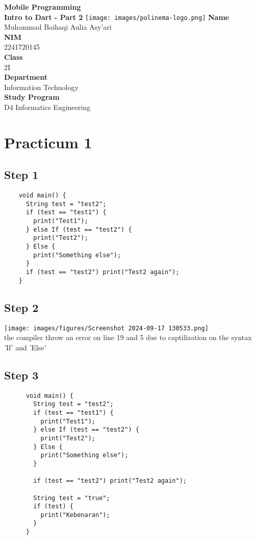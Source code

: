 \documentclass[12pt,titlepage]{article}
\newcommand{\vSubject}{Mobile Programming}
\newcommand{\vSubtitle}{Intro to Dart - Part 2}
\newcommand{\vName}{Muhammad Baihaqi Aulia Asy'ari}
\newcommand{\vNIM}{2241720145}
\newcommand{\vClass}{2I}
\newcommand{\vDepartment}{Information Technology}
\newcommand{\vStudyProgram}{D4 Informatics Engineering}
\begin{document}
\begin{titlepage}
    \centering
    \vfill
    {\bfseries\LARGE
        \vSubject\\
        \vskip0.25cm
        \vSubtitle
    }
    \vfill
    \texttt{[image: images/polinema-logo.png]}
    \vfill
    {
        \textbf{Name}\\
        \vName\\
        \vskip0.5cm
        \textbf{NIM}\\
        \vNIM\\
        \vskip0.5cm
        \textbf{Class}\\
        \vClass\\
        \vskip0.5cm
        \textbf{Department}\\
        \vDepartment\\
        \vskip0.5cm
        \textbf{Study Program}\\
        \vStudyProgram
    }
\end{titlepage}

\newpage

\section*{Practicum 1}
\subsection*{Step 1}
\begin{verbatim}
    void main() {
      String test = "test2";
      if (test == "test1") {
        print("Test1");
      } else If (test == "test2") {
        print("Test2");
      } Else {
        print("Something else");
      }
      if (test == "test2") print("Test2 again");
    }
\end{verbatim}

\subsection*{Step 2}
\texttt{[image: images/figures/Screenshot 2024-09-17 130533.png]} \\
the compiler throw an error on line 19 and 5 due to captilization on the syntax 'If' and 'Else'

\subsection*{Step 3}
\begin{verbatim}
      void main() {
        String test = "test2";
        if (test == "test1") {
          print("Test1");
        } else If (test == "test2") {
          print("Test2");
        } Else {
          print("Something else");
        }
      
        if (test == "test2") print("Test2 again");
        
        String test = "true";
        if (test) {
          print("Kebenaran");
        }
      }
\end{verbatim}
\end{document}

